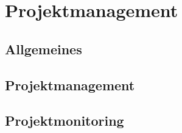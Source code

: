 \chapter{Projektmanagement}

\section{Allgemeines}

\section{Projektmanagement}

\section{Projektmonitoring}
